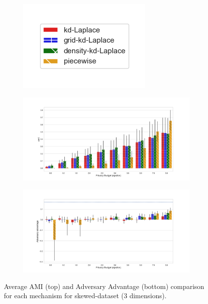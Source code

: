 \newpage

\begin{figure}[H]
  \centering
  \begin{subfigure}{0.30\textwidth}
    \includegraphics[width=\textwidth]{Results/kd-laplace/ami_bar_comparison_legend.png}
  \end{subfigure}
  \begin{subfigure}{1\textwidth}
    \includegraphics[width=1\textwidth]{Results/nd-laplace/ami_skewed-dataset_comparison.png}
  \end{subfigure}
  \begin{subfigure}{1\textwidth}
    \includegraphics[width=1\textwidth]{Results/nd-laplace/attack_adv_skewed-dataset_comparison.png}
  \end{subfigure}
  \caption{Average AMI (top) and Adversary Advantage (bottom) comparison for each mechanism for skewed-dataset (3 dimensions).}
  \label{fig:utility_skewed-dataset_comparison_nd_plot}
\end{figure}
\newpage



